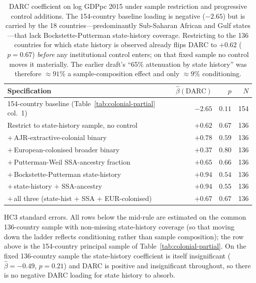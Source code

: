\documentclass[11pt,letterpaper]{article}
\begin{document}
\begin{table}[H]
\centering
\caption{DARC coefficient on log GDPpc 2015 under sample restriction and progressive control additions. The 154-country baseline loading is negative ($-2.65$) but is carried by the 18 countries---predominantly Sub-Saharan African and Gulf states---that lack Bockstette-Putterman state-history coverage. Restricting to the 136 countries for which state history is observed already flips DARC to $+0.62$ ($p=0.67$) \emph{before} any institutional control enters; on that fixed sample no control moves it materially. The earlier draft's ``65\% attenuation by state history'' was therefore $\approx 91\%$ a sample-composition effect and only $\approx 9\%$ conditioning.}
\label{tab:colonial-partial-extended}
\small
\begin{tabular}{lrrr}
\toprule
Specification & $\hat\beta(\text{DARC})$ & $p$ & $N$ \\
\midrule
154-country baseline (Table~\ref{tab:colonial-partial} col.\ 1) & $-2.65$ & $0.11$ & 154 \\
\midrule
Restrict to state-history sample, no control & $+0.62$ & $0.67$ & 136 \\
$+\,$AJR-extractive-colonial binary       & $+0.78$ & $0.59$ & 136 \\
$+\,$European-colonised broader binary    & $+0.37$ & $0.80$ & 136 \\
$+\,$Putterman-Weil SSA-ancestry fraction & $+0.65$ & $0.66$ & 136 \\
$+\,$Bockstette-Putterman state-history   & $+0.94$ & $0.54$ & 136 \\
$+\,$state-history $+$ SSA-ancestry       & $+0.94$ & $0.55$ & 136 \\
$+\,$all three (state-hist $+$ SSA $+$ EUR-colonised) & $+0.67$ & $0.67$ & 136 \\
\bottomrule
\end{tabular}
\par\smallskip\footnotesize{HC3 standard errors. All rows below the mid-rule are estimated on the common 136-country sample with non-missing state-history coverage (so that moving down the ladder reflects conditioning rather than sample composition); the row above is the 154-country principal sample of Table~\ref{tab:colonial-partial}. On the fixed 136-country sample the state-history coefficient is itself insignificant ($\hat\beta=-0.49$, $p=0.21$) and DARC is positive and insignificant throughout, so there is no negative DARC loading for state history to absorb.}
\end{table}
\end{document}
